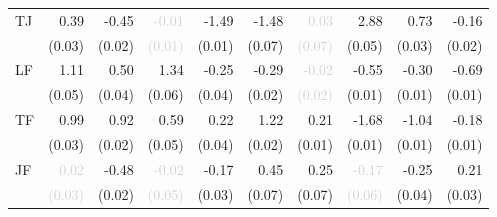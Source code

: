 \begin{tabular}{lrrrrrrrrr}
\multirow{2}{*}{TJ} &0.39 &-0.45 &\textcolor{LightGray}{-0.01} &-1.49 &-1.48 &\cellcolor{Gray}\textcolor{LightGray}{0.03} &2.88 &0.73 &-0.16\\
 &\tiny{(0.03)} &\tiny{(0.02)} &\textcolor{LightGray}{\tiny{(0.01)}} &\tiny{(0.01)} &\tiny{(0.07)} &\cellcolor{Gray}\textcolor{LightGray}{\tiny{(0.07)}} &\tiny{(0.05)} &\tiny{(0.03)} &\tiny{(0.02)}\\[1ex]
\multirow{2}{*}{LF} &1.11 &0.50 &1.34 &-0.25 &-0.29 &\textcolor{LightGray}{-0.02} &\cellcolor{Gray}-0.55 &-0.30 &-0.69\\
 &\tiny{(0.05)} &\tiny{(0.04)} &\tiny{(0.06)} &\tiny{(0.04)} &\tiny{(0.02)} &\textcolor{LightGray}{\tiny{(0.02)}} &\cellcolor{Gray}\tiny{(0.01)} &\tiny{(0.01)} &\tiny{(0.01)}\\[1ex]
\multirow{2}{*}{TF} &0.99 &0.92 &0.59 &0.22 &1.22 &0.21 &-1.68 &\cellcolor{Gray}-1.04 &-0.18\\
 &\tiny{(0.03)} &\tiny{(0.02)} &\tiny{(0.05)} &\tiny{(0.04)} &\tiny{(0.02)} &\tiny{(0.01)} &\tiny{(0.01)} &\cellcolor{Gray}\tiny{(0.01)} &\tiny{(0.01)}\\[1ex]
\multirow{2}{*}{JF} &\textcolor{LightGray}{0.02} &-0.48 &\textcolor{LightGray}{-0.02} &-0.17 &0.45 &0.25 &\textcolor{LightGray}{-0.17} &-0.25 &\cellcolor{Gray}0.21\\
 &\textcolor{LightGray}{\tiny{(0.03)}} &\tiny{(0.02)} &\textcolor{LightGray}{\tiny{(0.05)}} &\tiny{(0.03)} &\tiny{(0.07)} &\tiny{(0.07)} &\textcolor{LightGray}{\tiny{(0.06)}} &\tiny{(0.04)} &\cellcolor{Gray}\tiny{(0.03)}\\[1ex]
\bottomrule
\end{tabular}
